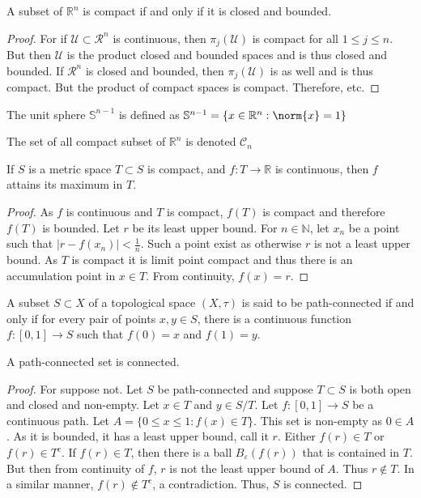 \documentclass[crop=false,class=article,oneside]{standalone}
\begin{document}
        \begin{theorem}
        A subset of $\mathbb{R}^n$ is compact if and only if it is closed and bounded.
        \end{theorem}
        \begin{proof}
        For if $\mathcal{U}\subset \mathcal{R}^n$ is continuous, then $\pi_{j}(\mathcal{U})$ is compact for all $1\leq j \leq n$. But then $\mathcal{U}$ is the product closed and bounded spaces and is thus closed and bounded. If $\mathcal{R}^n$ is closed and bounded, then $\pi_j(\mathcal{U})$ is as well and is thus compact. But the product of compact spaces is compact. Therefore, etc.
        \end{proof}
        \begin{definition}
        The unit sphere $\mathbb{S}^{n-1}$ is defined as $\mathbb{S}^{n-1} = \{x\in \mathbb{R}^n: \norm{x}=1\}$
        \end{definition}
        \begin{notation}
        The set of all compact subset of $\mathbb{R}^n$ is denoted $\mathscr{C}_n$
        \end{notation}
        \begin{theorem}
        If $S$ is a metric space $T\subset S$ is compact, and $f:T\rightarrow \mathbb{R}$ is continuous, then $f$ attains its maximum in $T$.
        \end{theorem}
        \begin{proof}
        As $f$ is continuous and $T$ is compact, $f(T)$ is compact and therefore $f(T)$ is bounded. Let $r$ be its least upper bound. For $n\in \mathbb{N}$, let $x_n$ be a point such that $|r-f(x_n)|< \frac{1}{n}$. Such a point exist as otherwise $r$ is not a least upper bound. As $T$ is compact it is limit point compact and thus there is an accumulation point in $x\in T$. From continuity, $f(x) = r$.
        \end{proof}
        \begin{definition}
        A subset $S\subset X$ of a topological space $(X,\tau)$ is said to be path-connected if and only if for every pair of points $x,y\in S$, there is a continuous function $f:[0,1]\rightarrow S$ such that $f(0)=x$ and $f(1)=y$.
        \end{definition}
        \begin{theorem}
        A path-connected set is connected.
        \end{theorem}
        \begin{proof}
        For suppose not. Let $S$ be path-connected and suppose $T\subset S$ is both open and closed and non-empty. Let $x\in T$ and $y\in S/T$. Let $f:[0,1]\rightarrow S$ be a continuous path. Let $A =\{0\leq x \leq 1: f(x) \in T\}$. This set is non-empty as $0\in A$. As it is bounded, it has a least upper bound, call it $r$. Either $f(r)\in T$ or $f(r)\in T^c$. If $f(r)\in T$, then there is a ball $B_{\varepsilon}(f(r))$ that is contained in $T$. But then from continuity of $f$, $r$ is not the least upper bound of $A$. Thus $r\notin T$. In a similar manner, $f(r)\notin T^c$, a contradiction. Thus, $S$ is connected.
        \end{proof}
\end{document}
